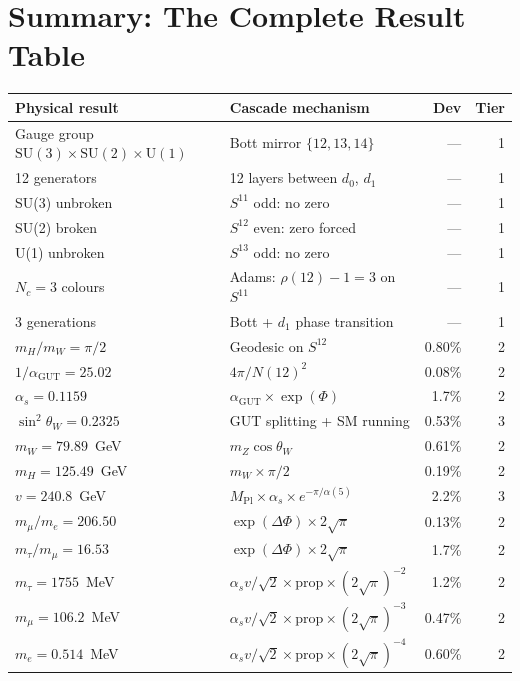 \documentclass[12pt,a4paper]{article}
\begin{document}
\section{Summary: The Complete Result Table}

\begin{center}
\small
\begin{tabular}{llrr}
\hline
Physical result & Cascade mechanism & Dev & Tier \\
\hline
Gauge group $\text{SU}(3) \times \text{SU}(2) \times \text{U}(1)$ & Bott mirror $\{12, 13, 14\}$ & --- & 1 \\
12 generators & 12 layers between $d_0$, $d_1$ & --- & 1 \\
SU(3) unbroken & $S^{11}$ odd: no zero & --- & 1 \\
SU(2) broken & $S^{12}$ even: zero forced & --- & 1 \\
U(1) unbroken & $S^{13}$ odd: no zero & --- & 1 \\
$N_c = 3$ colours & Adams: $\rho(12) - 1 = 3$ on $S^{11}$ & --- & 1 \\
3 generations & Bott + $d_1$ phase transition & --- & 1 \\
$m_H/m_W = \pi/2$ & Geodesic on $S^{12}$ & 0.80\% & 2 \\
$1/\alpha_{\text{GUT}} = 25.02$ & $4\pi/N(12)^2$ & 0.08\% & 2 \\
$\alpha_s = 0.1159$ & $\alpha_{\text{GUT}} \times \exp(\Phi)$ & 1.7\% & 2 \\
$\sin^2\theta_W = 0.2325$ & GUT splitting + SM running & 0.53\% & 3 \\
$m_W = 79.89$~GeV & $m_Z\cos\theta_W$ & 0.61\% & 2 \\
$m_H = 125.49$~GeV & $m_W \times \pi/2$ & 0.19\% & 2 \\
$v = 240.8$~GeV & $M_{\text{Pl}} \times \alpha_s \times e^{-\pi/\alpha(5)}$ & 2.2\% & 3 \\
$m_\mu/m_e = 206.50$ & $\exp(\Delta\Phi) \times 2\sqrt{\pi}$ & 0.13\% & 2 \\
$m_\tau/m_\mu = 16.53$ & $\exp(\Delta\Phi) \times 2\sqrt{\pi}$ & 1.7\% & 2 \\
$m_\tau = 1755$~MeV & $\alpha_s v/\sqrt{2} \times \text{prop} \times (2\sqrt{\pi})^{-2}$ & 1.2\% & 2 \\
$m_\mu = 106.2$~MeV & $\alpha_s v/\sqrt{2} \times \text{prop} \times (2\sqrt{\pi})^{-3}$ & 0.47\% & 2 \\
$m_e = 0.514$~MeV & $\alpha_s v/\sqrt{2} \times \text{prop} \times (2\sqrt{\pi})^{-4}$ & 0.60\% & 2 \\

\end{tabular}
\end{center}
\end{document}

